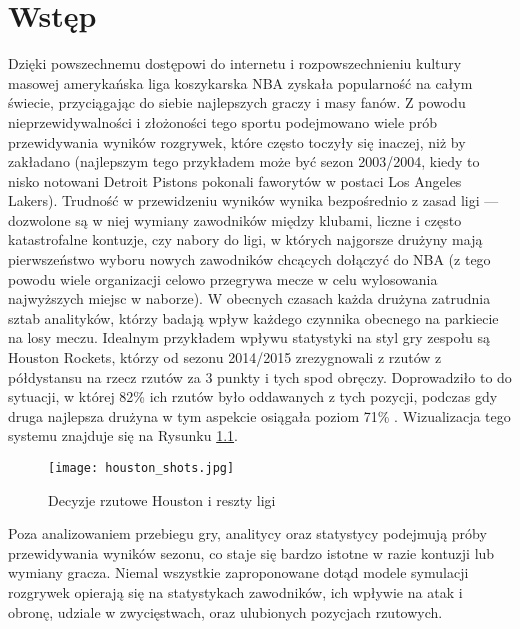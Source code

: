\documentclass[inzynierska]{pwr_wmat_praca_dyplomowa}
\theoremstyle{plain}
\numberwithin{theorem}{chapter}
\theoremstyle{definition}
\numberwithin{theorem}{chapter}
\begin{document}
\frontmatter
\maketitle
\mainmatter
\tableofcontents

{\backmatter \chapter{Wstęp}}
Dzięki powszechnemu dostępowi do internetu i rozpowszechnieniu kultury masowej amerykańska liga koszykarska NBA zyskała popularność na całym świecie, przyciągając do siebie najlepszych graczy i masy fanów. Z powodu nieprzewidywalności i złożoności tego sportu podejmowano wiele prób przewidywania wyników rozgrywek, które często toczyły się inaczej, niż by zakładano (najlepszym tego przykładem może być sezon 2003/2004, kiedy to nisko notowani Detroit Pistons pokonali faworytów w postaci Los Angeles Lakers). Trudność w przewidzeniu wyników wynika bezpośrednio z zasad ligi --- dozwolone są w niej wymiany zawodników między klubami, liczne i często katastrofalne kontuzje, czy nabory do ligi, w których najgorsze drużyny mają pierwszeństwo wyboru nowych zawodników chcących dołączyć do NBA (z tego powodu wiele organizacji celowo przegrywa mecze w celu wylosowania najwyższych miejsc w naborze). W obecnych czasach każda drużyna zatrudnia sztab analityków, którzy badają wpływ każdego czynnika obecnego na parkiecie na losy meczu. Idealnym przykładem wpływu statystyki na styl gry zespołu są Houston Rockets, którzy od sezonu 2014/2015 zrezygnowali z rzutów z półdystansu na rzecz rzutów za 3 punkty i tych spod obręczy. Doprowadziło to do sytuacji, w której 82\% ich rzutów było oddawanych z tych pozycji, podczas gdy druga najlepsza drużyna w tym aspekcie osiągała poziom 71\% \cite{houston}. Wizualizacja tego systemu znajduje się na Rysunku \ref{houston_shots}.
\begin{figure}[h]
	\hspace*{-1cm}
	\texttt{[image: houston\_shots.jpg]}
	\caption{Decyzje rzutowe Houston i reszty ligi}\label{houston_shots}
	\centering
\end{figure}
 Poza analizowaniem przebiegu gry, analitycy oraz statystycy podejmują próby przewidywania wyników sezonu, co staje się bardzo istotne w razie kontuzji lub wymiany gracza.\cite{replayNBA} \cite{graphicalNBA} Niemal wszystkie zaproponowane dotąd modele symulacji rozgrywek opierają się na statystykach zawodników, ich wpływie na atak i obronę, udziale w zwycięstwach, oraz ulubionych pozycjach rzutowych. \\
 
\end{document}

